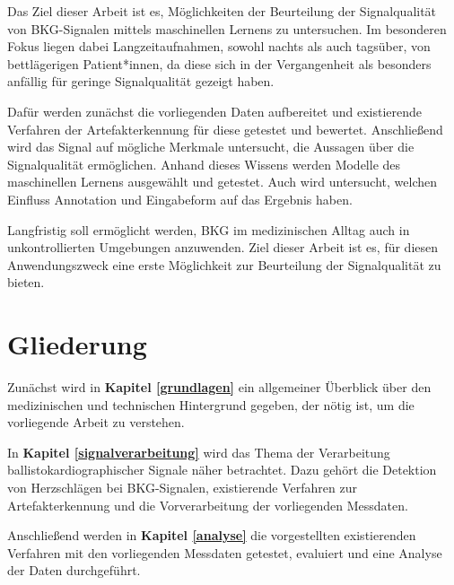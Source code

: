 Das Ziel dieser Arbeit ist es, Möglichkeiten der Beurteilung der Signalqualität von \ac{BKG}-Signalen mittels maschinellen Lernens zu untersuchen. Im besonderen Fokus liegen dabei Langzeitaufnahmen, sowohl nachts als auch tagsüber, von bettlägerigen Patient*innen, da diese sich in der Vergangenheit als besonders anfällig für geringe Signalqualität gezeigt haben.

Dafür werden zunächst die vorliegenden Daten aufbereitet und existierende Verfahren der Artefakterkennung für diese getestet und bewertet. Anschließend wird das Signal auf mögliche Merkmale untersucht, die Aussagen über die Signalqualität ermöglichen. Anhand dieses Wissens werden Modelle des maschinellen Lernens ausgewählt und getestet. Auch wird untersucht, welchen Einfluss Annotation und Eingabeform auf das Ergebnis haben.

Langfristig soll ermöglicht werden, \acf{BKG} im medizinischen Alltag auch in unkontrollierten Umgebungen anzuwenden. Ziel dieser Arbeit ist es, für diesen Anwendungszweck eine erste Möglichkeit zur Beurteilung der Signalqualität zu bieten.%

\section{Gliederung}

Zunächst wird in \textbf{Kapitel \ref{grundlagen}} ein allgemeiner Überblick über den medizinischen und technischen Hintergrund gegeben, der nötig ist, um die vorliegende Arbeit zu verstehen.

In \textbf{Kapitel \ref{signalverarbeitung}} wird das Thema der Verarbeitung ballistokardiographischer Signale näher betrachtet. Dazu gehört die Detektion von Herzschlägen bei \ac{BKG}-Signalen, existierende Verfahren zur Artefakterkennung und die Vorverarbeitung der vorliegenden Messdaten.

Anschließend werden in \textbf{Kapitel \ref{analyse}} die vorgestellten existierenden Verfahren mit den vorliegenden Messdaten getestet, evaluiert und eine Analyse der Daten durchgeführt.


